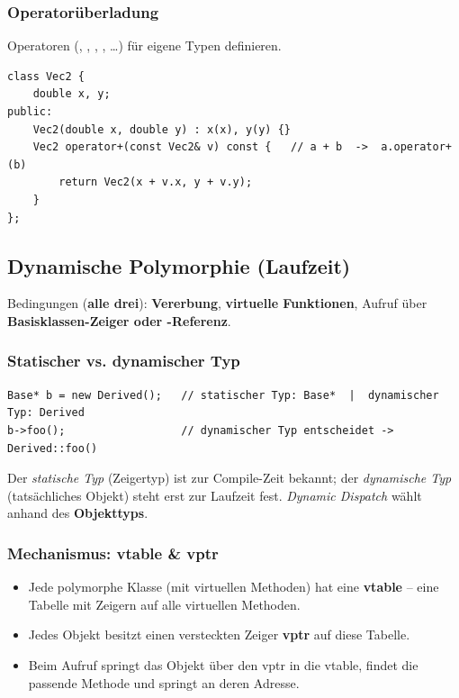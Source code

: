 \subsubsection*{Operator\"uberladung}
Operatoren (\code{+}, \code{*}, \code{==}, \code{<<}, \dots) f\"ur eigene Typen definieren.
\begin{lstlisting}
class Vec2 {
    double x, y;
public:
    Vec2(double x, double y) : x(x), y(y) {}
    Vec2 operator+(const Vec2& v) const {   // a + b  ->  a.operator+(b)
        return Vec2(x + v.x, y + v.y);
    }
};
\end{lstlisting}

\subsection{Dynamische Polymorphie (Laufzeit)}
Bedingungen (\textbf{alle drei}): \textbf{Vererbung}, \textbf{virtuelle Funktionen}, Aufruf \"uber \textbf{Basisklassen-Zeiger oder -Referenz}.

\subsubsection*{Statischer vs. dynamischer Typ}
\begin{lstlisting}
Base* b = new Derived();   // statischer Typ: Base*  |  dynamischer Typ: Derived
b->foo();                  // dynamischer Typ entscheidet -> Derived::foo()
\end{lstlisting}
Der \emph{statische Typ} (Zeigertyp) ist zur Compile-Zeit bekannt; der \emph{dynamische Typ} (tats\"achliches Objekt) steht erst zur Laufzeit fest. \emph{Dynamic Dispatch} w\"ahlt anhand des \textbf{Objekttyps}.

\subsubsection*{Mechanismus: vtable \& vptr}
\begin{itemize}
  \item Jede polymorphe Klasse (mit virtuellen Methoden) hat eine \textbf{vtable} -- eine Tabelle mit Zeigern auf alle virtuellen Methoden.
  \item Jedes Objekt besitzt einen versteckten Zeiger \textbf{vptr} auf diese Tabelle.
  \item Beim Aufruf springt das Objekt \"uber den vptr in die vtable, findet die passende Methode und springt an deren Adresse.
\end{itemize}

